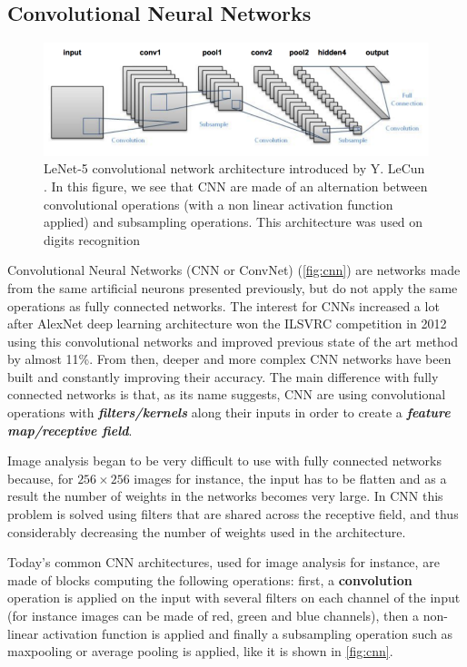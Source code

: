 \documentclass[master, tikz, final,11pt, dvipdfmx]{iscs-thesis}
\begin{document}
\subsection{Convolutional Neural Networks}


\begin{figure}[!h]

\includegraphics[width=\textwidth]{lenet}

	\caption[Architecture of a traditional convolutional neural network.]{LeNet-5 convolutional network architecture introduced by Y. LeCun . In this figure, we see that CNN are made of an alternation between convolutional operations (with a non linear activation function applied) and subsampling operations. This architecture was used on digits recognition}
	\label{fig:cnn}
\end{figure}


Convolutional Neural Networks (CNN or ConvNet) \cite{unpool,CNNrecent} (\autoref{fig:cnn}) are networks made from the same artificial neurons presented previously, but do not apply the same operations as fully connected networks.
The interest for CNNs increased a lot after AlexNet deep learning architecture won the ILSVRC competition in 2012 using this convolutional networks and improved previous state of the art method by almost 11\%. From then, deeper and more complex CNN networks have been built and constantly improving their accuracy.
The main difference with fully connected networks is that, as its name suggests, CNN are using convolutional operations with \textbf{\textit{filters/kernels}} along their inputs in order to create a \textbf{\textit{feature map/receptive field}}.

Image analysis began to be very difficult to use with fully connected networks because, for $256\times 256$ images for instance, the input has to be flatten and as a result the number of weights in the networks becomes very large. In CNN this problem is solved using filters that are shared across the receptive field, and thus considerably decreasing the number of weights used in the architecture.

Today's common CNN architectures, used for image analysis for instance, are made of blocks computing the following operations: first, a \textbf{convolution} operation is applied on the input with several filters on each channel of the input (for instance images can be made of red, green and blue channels), then a non-linear activation function is applied and finally a subsampling operation such as maxpooling or average pooling is applied, like it is shown in \autoref{fig:cnn}.
\end{document}
